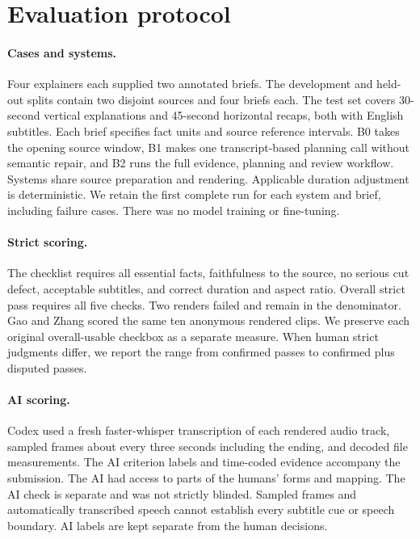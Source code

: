 \section{Evaluation protocol}
\label{sec:protocol}
\paragraph{Cases and systems.}
Four explainers each supplied two annotated briefs. The development and held-out splits contain two disjoint sources and four briefs each. The test set covers 30-second vertical explanations and 45-second horizontal recaps, both with English subtitles. Each brief specifies fact units and source reference intervals. B0 takes the opening source window, B1 makes one transcript-based planning call without semantic repair, and B2 runs the full evidence, planning and review workflow. Systems share source preparation and rendering. Applicable duration adjustment is deterministic. We retain the first complete run for each system and brief, including failure cases. There was no model training or fine-tuning.

\paragraph{Strict scoring.}
The checklist requires all essential facts, faithfulness to the source, no serious cut defect, acceptable subtitles, and correct duration and aspect ratio. Overall strict pass requires all five checks. Two renders failed and remain in the denominator. Gao and Zhang scored the same ten anonymous rendered clips. We preserve each original overall-usable checkbox as a separate measure. When human strict judgments differ, we report the range from confirmed passes to confirmed plus disputed passes.

\paragraph{AI scoring.}
Codex used a fresh faster-whisper transcription of each rendered audio track, sampled frames about every three seconds including the ending, and decoded file measurements. The AI criterion labels and time-coded evidence accompany the submission. The AI had access to parts of the humans' forms and mapping. The AI check is separate and was not strictly blinded. Sampled frames and automatically transcribed speech cannot establish every subtitle cue or speech boundary. AI labels are kept separate from the human decisions.

